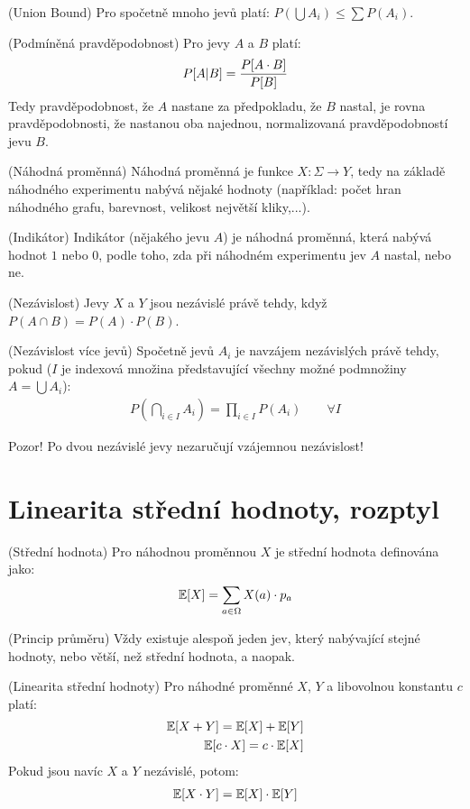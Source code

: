 \tv (Union Bound) Pro spočetně mnoho jevů platí: $P(\bigcup A_i) \leq \sum 
P(A_i)$.

\df (Podmíněná pravděpodobnost) Pro jevy $A$ a $B$ platí:
\begin{align}
	P[A|B] = {P[A \cdot B] \over P[B]}
\end{align}
Tedy pravděpodobnost, že $A$ nastane za předpokladu, že $B$ nastal, je rovna 
pravděpodobnosti, že nastanou oba najednou, normalizovaná pravděpodobností jevu 
$B$.

\df (Náhodná proměnná) Náhodná proměnná je funkce $X: \Sigma \to Y$, tedy na 
základě náhodného experimentu nabývá nějaké hodnoty (například: počet hran 
náhodného grafu, barevnost, velikost největší kliky,...).

\df (Indikátor) Indikátor (nějakého jevu $A$) je náhodná proměnná, která nabývá 
hodnot $1$ nebo $0$, podle toho, zda při náhodném experimentu jev $A$ nastal, 
nebo ne.

\df (Nezávislost) Jevy $X$ a $Y$ jsou nezávislé právě tehdy, když $P(A\cap B) = 
P(A) \cdot P(B)$.

\df (Nezávislost více jevů) Spočetně jevů $A_i$ je navzájem nezávislých právě 
tehdy, pokud ($I$ je indexová množina představující všechny možné podmnožiny $A 
= \bigcup A_i$):
\begin{align}
	P\left(\bigcap_{i \in I} A_i\right) = \prod_{i\in I} P(A_i) \qquad \forall I 
\end{align}

\pzn Pozor! Po dvou nezávislé jevy nezaručují vzájemnou nezávislost!

\section{Linearita střední hodnoty, rozptyl}

\df (Střední hodnota) Pro náhodnou proměnnou $X$ je střední hodnota definována 
jako:
\begin{align}
	\mathbb{E}[X] = \sum_{a \in \Omega} X(a) \cdot p_a
\end{align}

\vt (Princip průměru) Vždy existuje alespoň jeden jev, který nabývající stejné 
hodnoty, nebo větší, než střední hodnota, a naopak.

\vt (Linearita střední hodnoty) Pro náhodné proměnné $X$, $Y$ a libovolnou 
konstantu $c$ platí:
\begin{align}
	\mathbb{E}[X+Y] = \mathbb{E}[X] + \mathbb{E}[Y] \\
	\mathbb{E}[c \cdot X] = c \cdot \mathbb{E}[X]
\end{align}
Pokud jsou navíc $X$ a $Y$ nezávislé, potom:
\begin{align}
	\mathbb{E}[X \cdot Y] = \mathbb{E}[X] \cdot \mathbb{E}[Y]
\end{align}

